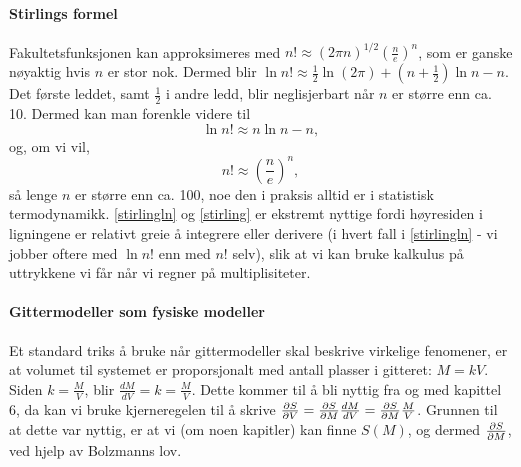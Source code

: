 \paragraph{Stirlings formel}  Fakultetsfunksjonen kan approks\-imeres med $n!\approx(2\pi n)^{1/2}\left(\frac{n}{e}\right)^n$, som er ganske nøyaktig hvis $n$ er stor nok. Dermed blir $\ln n!\approx\frac{1}{2}\ln(2\pi)+(n+\frac{1}{2})\ln n-n$. Det første leddet, samt $\frac{1}{2}$ i andre ledd, blir neglisjerbart når $n$ er større enn ca. 10. Dermed kan man forenkle videre til 
\begin{equation}
	\label{stirlingln}
	\ln n!\approx n\ln n - n,	
\end{equation}
og, om vi vil,
\begin{equation}
	\label{stirling}
	n!\approx\left(\frac{n}{e}\right)^n,
\end{equation}
så lenge $n$ er større enn ca. 100, noe den i praksis alltid er i statistisk termodynamikk. \eqref{stirlingln} og \eqref{stirling} er ekstremt nyttige fordi høyresiden i ligningene er relativt greie å integrere eller derivere (i hvert fall i \eqref{stirlingln} - vi jobber oftere med $\ln n!$ enn med $n!$ selv), slik at vi kan bruke kalkulus på uttrykkene vi får når vi regner på multiplisiteter.

\paragraph{Gittermodeller som fysiske modeller} Et standard triks å bruke når gittermodeller skal beskrive virkelige fenomener, er at volumet til systemet er proporsjonalt med antall plasser i gitteret: $M=kV$. Siden $k=\frac{M}{V}$, blir $\frac{dM}{dV}=k=\frac{M}{V}$. Dette kommer til å bli nyttig fra og med kapittel 6, da kan vi bruke kjerneregelen til å skrive $\frac{\partial S}{\partial V}=\frac{\partial S}{\partial M}\frac{dM}{dV}=\frac{\partial S}{\partial M}\frac{M}{V}$. Grunnen til at dette var nyttig, er at vi (om noen kapitler) kan finne $S(M)$, og dermed $\frac{\partial S}{\partial M}$, ved hjelp av Bolzmanns lov.